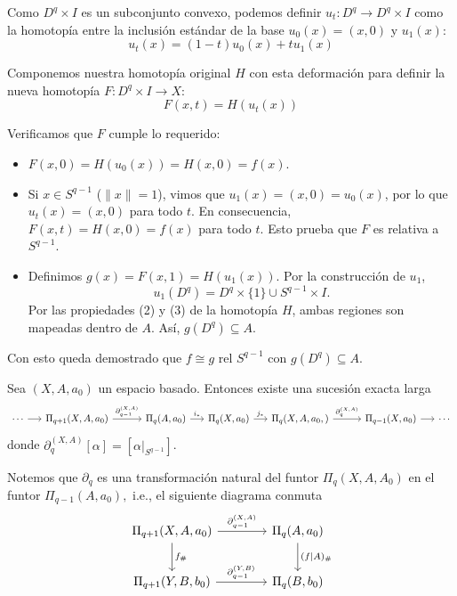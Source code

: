 \begin{dem}
    Como $D^q \times I$ es un subconjunto convexo, podemos definir $u_t: D^q \to D^q \times I$ como la homotopía entre la inclusión estándar de la base $u_0(x) = (x,0)$ y $u_1(x)$:
    \begin{equation*}
        u_t(x) = (1-t)u_0(x) + t u_1(x)
    \end{equation*}
    
    Componemos nuestra homotopía original $H$ con esta deformación para definir la nueva homotopía $F: D^q \times I \to X$:
    \begin{equation*}
        F(x,t) = H(u_t(x))
    \end{equation*}
    
    Verificamos que $F$ cumple lo requerido:
    \begin{itemize}
        \item  $F(x,0) = H(u_0(x)) = H(x,0) = f(x)$.
        \item Si $x \in S^{q-1}$ ($\|x\|=1$), vimos que $u_1(x) = (x,0) = u_0(x)$, por lo que $u_t(x) = (x,0)$ para todo $t$. En consecuencia, $F(x,t) = H(x,0) = f(x)$ para todo $t$. Esto prueba que $F$ es relativa a $S^{q-1}$.
        \item Definimos $g(x) = F(x,1) = H(u_1(x))$. Por la construcción de $u_1$,
        $$u_1(D^q)=D^q\times\{1\}\cup S^{q-1}\times I.$$ Por las propiedades (2) y (3) de la homotopía $H$, ambas regiones son mapeadas dentro de $A$. Así, $g(D^q) \subseteq A$.
    \end{itemize}
    
    Con esto queda demostrado que $f \cong g \text{ rel } S^{q-1}$ con $g(D^q) \subseteq A$.
\end{dem}
\begin{prop}
    Sea $(X,A,a_0)$ un espacio basado. Entonces existe una sucesión exacta larga
    \begin{equation*}
        \begin{tikzcd}[column sep=0.5cm]
            \cdots\arrow[r] & \Pi_{q+1}(X,A,a_0)\arrow[r,"\partial_{q-1}^{(X,A)}"] & [0.55cm]\Pi_q(A,a_0)\arrow[r,"i_*"] &\Pi_q(X,a_0)\arrow[r,"j_*"]& \Pi_q(X,A,a_0,)\arrow[r,"\partial_{q}^{(X,A)}"] & [0.52cm]\Pi_{q-1}(X,a_0)\arrow[r]&\cdots
        \end{tikzcd}
    \end{equation*}
    donde $\partial_q^{(X,A)}[\alpha]=[\alpha|_{S^{q-1}}]$. 
    
    Notemos que $\partial_q$ es una transformación natural del funtor $\Pi_q(X,A,A_0)$ en el funtor $\Pi_{q-1}(A,a_0),$ i.e., el siguiente diagrama conmuta
    \begin{equation*}
        \begin{tikzcd}[row sep=0.8cm]
            \Pi_{q+1}(X,A,a_0)\arrow[r,"\partial_{q-1}^{(X,A)}"]\arrow[d,"f_\#"] & [0.55cm]\Pi_q(A,a_0)\arrow[d,"(f|A)_{\#}"]\\
            \Pi_{q+1}(Y,B,b_0)\arrow[r,"\partial_{q-1}^{(Y,B)}"] & [0.55cm]\Pi_q(B,b_0)
        \end{tikzcd}
    \end{equation*}
\end{prop}
